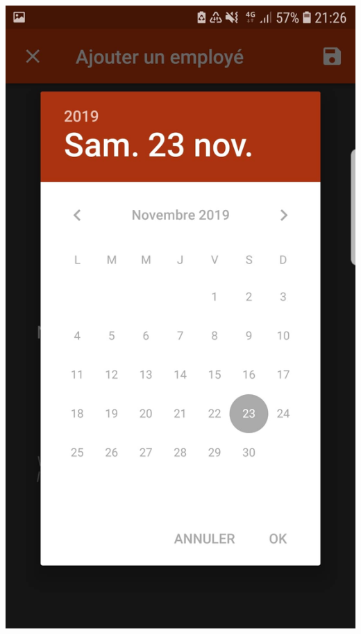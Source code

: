 \documentclass{article}
\begin{document}
\begin{center}
    \includegraphics[scale=0.1]{calendar.jpg}
\end{center}

\newpage
\end{document}
